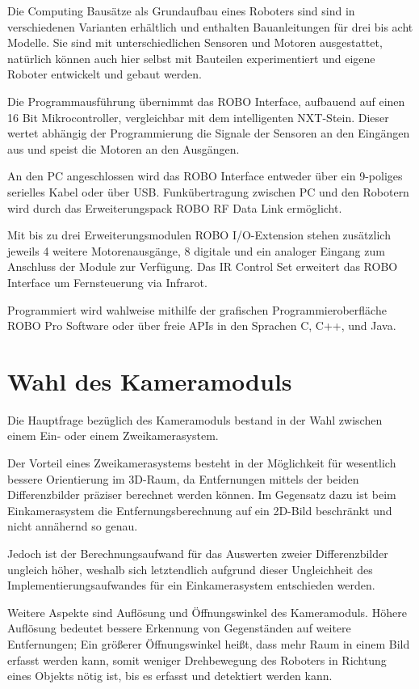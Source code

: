 Die Computing Bausätze als Grundaufbau eines Roboters sind sind in verschiedenen Varianten erhältlich und enthalten Bauanleitungen für drei bis acht Modelle. Sie sind mit unterschiedlichen Sensoren und Motoren ausgestattet, natürlich können auch hier selbst mit Bauteilen experimentiert und eigene Roboter entwickelt und gebaut werden.

Die Programmausführung übernimmt das ROBO Interface, aufbauend auf einen 16 Bit Mikrocontroller, vergleichbar mit dem intelligenten NXT-Stein. Dieser wertet abhängig der Programmierung die Signale der Sensoren an den Eingängen aus und speist die Motoren an den Ausgängen.

An den PC angeschlossen wird das ROBO Interface entweder über ein 9-poliges serielles Kabel oder über USB. Funkübertragung zwischen PC und den Robotern wird durch das Erweiterungspack ROBO RF Data Link ermöglicht.

Mit bis zu drei Erweiterungsmodulen ROBO I/O-Extension stehen zusätzlich jeweils 4 weitere Motorenausgänge, 8 digitale und ein analoger Eingang zum Anschluss der Module zur Verfügung. Das IR Control Set erweitert das ROBO Interface um Fernsteuerung via Infrarot.

Programmiert wird wahlweise mithilfe der grafischen Programmieroberfläche ROBO Pro Software oder über freie APIs in den Sprachen C, C++, und Java.

\section{Wahl des Kameramoduls}
\label{sec:Kamera}

Die Hauptfrage bezüglich des Kameramoduls bestand in der Wahl zwischen einem Ein- oder einem Zweikamerasystem.

Der Vorteil eines Zweikamerasystems besteht in der Möglichkeit für wesentlich bessere Orientierung im 3D-Raum, da Entfernungen mittels der beiden Differenzbilder präziser berechnet werden können.
Im Gegensatz dazu ist beim Einkamerasystem die Entfernungsberechnung auf ein 2D-Bild beschränkt und nicht annähernd so genau.

Jedoch ist der Berechnungsaufwand für das Auswerten zweier Differenzbilder ungleich höher, weshalb sich letztendlich aufgrund dieser Ungleichheit des Implementierungsaufwandes für ein Einkamerasystem entschieden werden.

Weitere Aspekte sind Auflösung und Öffnungswinkel des Kameramoduls.
Höhere Auflösung bedeutet bessere Erkennung von Gegenständen auf weitere Entfernungen; Ein größerer Öffnungswinkel heißt, dass mehr Raum in einem Bild erfasst werden kann, somit weniger Drehbewegung des Roboters in Richtung eines Objekts nötig ist, bis es erfasst und detektiert werden kann.

